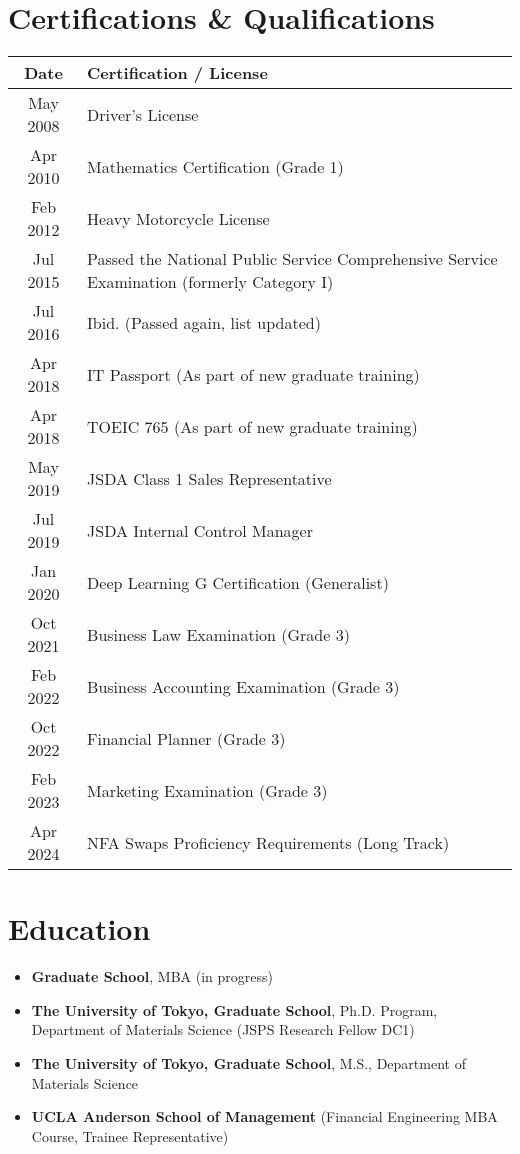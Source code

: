 \documentclass[uplatex,a4j,10.5pt,dvipdfmx]{jsarticle}
\begin{document}
\section*{Certifications \& Qualifications}

\begin{longtable}{|c|l|}
	\hline
	\centering\textbf{Date} & \textbf{Certification / License} \\
	\hline
	\endhead

	\hline
	May 2008 & Driver's License \\
	\hline
	Apr 2010 & Mathematics Certification (Grade 1) \\
	\hline
	Feb 2012 & Heavy Motorcycle License \\
	\hline
	Jul 2015 & Passed the National Public Service Comprehensive Service Examination (formerly Category I) \\
	\hline
	Jul 2016 & Ibid. (Passed again, list updated) \\
	\hline
	Apr 2018 & IT Passport (As part of new graduate training) \\
	\hline
	Apr 2018 & TOEIC 765 (As part of new graduate training) \\
	\hline
	May 2019 & JSDA Class 1 Sales Representative \\
	\hline
	Jul 2019 & JSDA Internal Control Manager \\
	\hline
	Jan 2020 & Deep Learning G Certification (Generalist) \\
	\hline
	Oct 2021 & Business Law Examination (Grade 3) \\
	\hline
	Feb 2022 & Business Accounting Examination (Grade 3) \\
	\hline
	Oct 2022 & Financial Planner (Grade 3) \\
	\hline
	Feb 2023 & Marketing Examination (Grade 3) \\
	\hline
	Apr 2024 & NFA Swaps Proficiency Requirements (Long Track) \\
	\hline
\end{longtable}

\section*{Education}
\begin{itemize}[leftmargin=*]
	\item \textbf{Graduate School}, MBA (in progress)
	\item \textbf{The University of Tokyo, Graduate School}, Ph.D. Program, Department of Materials Science (JSPS Research Fellow DC1)
	\item \textbf{The University of Tokyo, Graduate School}, M.S., Department of Materials Science
	\item \textbf{UCLA Anderson School of Management} (Financial Engineering MBA Course, Trainee Representative)
\end{itemize}
\end{document}
